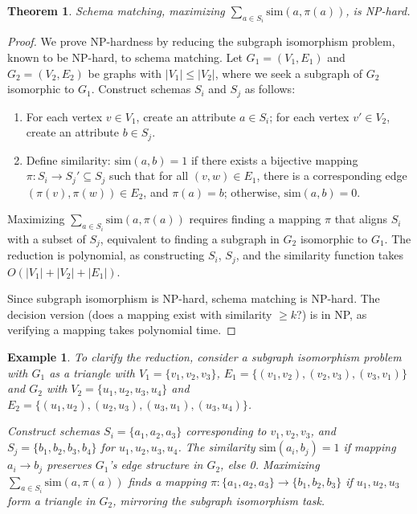 \documentclass{amsart}
\newtheorem{thm}{Theorem}
\newtheorem{exa}{Example}
\begin{document}
\begin{thm} \label{thm:schema_matching_np_hard}
Schema matching, maximizing \( \sum_{a \in S_i} \text{sim}(a, \pi(a)) \), is NP-hard.
\end{thm}
\begin{proof}
We prove NP-hardness by reducing the subgraph isomorphism problem, known to be NP-hard, to schema matching. Let \( G_1 = (V_1, E_1) \) and \( G_2 = (V_2, E_2) \) be graphs with \( |V_1| \leq |V_2| \), where we seek a subgraph of \( G_2 \) isomorphic to \( G_1 \). Construct schemas \( S_i \) and \( S_j \) as follows:
\begin{enumerate}
    \item For each vertex \( v \in V_1 \), create an attribute \( a \in S_i \); for each vertex \( v' \in V_2 \), create an attribute \( b \in S_j \).
    \item Define similarity: \( \text{sim}(a, b) = 1 \) if there exists a bijective mapping \( \pi: S_i \to S_j' \subseteq S_j \) such that for all \( (v, w) \in E_1 \), there is a corresponding edge \( (\pi(v), \pi(w)) \in E_2 \), and \( \pi(a) = b \); otherwise, \( \text{sim}(a, b) = 0 \).
\end{enumerate}
Maximizing
$
 \sum_{a \in S_i} \text{sim}(a, \pi(a))
$
requires finding a mapping \( \pi \) that aligns \( S_i \) with a subset of \( S_j \), equivalent to finding a subgraph in \( G_2 \) isomorphic to \( G_1 \). The reduction is polynomial, as constructing \( S_i \), \( S_j \), and the similarity function takes   $ O(|V_1| + |V_2| + |E_1|).$

Since subgraph isomorphism is NP-hard, schema matching is NP-hard. The decision version (does a mapping exist with similarity \( \geq k \)?) is in NP, as verifying a mapping takes polynomial time.
\end{proof}

\begin{exa} To clarify the reduction, consider a subgraph isomorphism problem with \( G_1 \) as a triangle with
$
 V_1 = \{v_1, v_2, v_3\}$, 
 $E_1 = \{(v_1, v_2), (v_2, v_3), (v_3, v_1)\}$
and \( G_2 \) with
$ V_2 = \{u_1, u_2, u_3, u_4\}$ and $E_2 = \{(u_1, u_2), (u_2, u_3), (u_3, u_1), (u_3, u_4)\}$.

Construct schemas \( S_i = \{a_1, a_2, a_3\} \) corresponding to \( v_1, v_2, v_3 \), and \( S_j = \{b_1, b_2, b_3, b_4\} \) for \( u_1, u_2, u_3, u_4 \). The similarity \( \text{sim}(a_i, b_j) = 1 \) if mapping \( a_i \to b_j \) preserves \( G_1 \)’s edge structure in \( G_2 \), else 0. Maximizing
$
 \sum_{a \in S_i} \text{sim}(a, \pi(a))
$
finds a mapping \( \pi: \{a_1, a_2, a_3\} \to \{b_1, b_2, b_3\} \) if \( u_1, u_2, u_3 \) form a triangle in \( G_2 \), mirroring the subgraph isomorphism task.
\end{exa}
\end{document}
